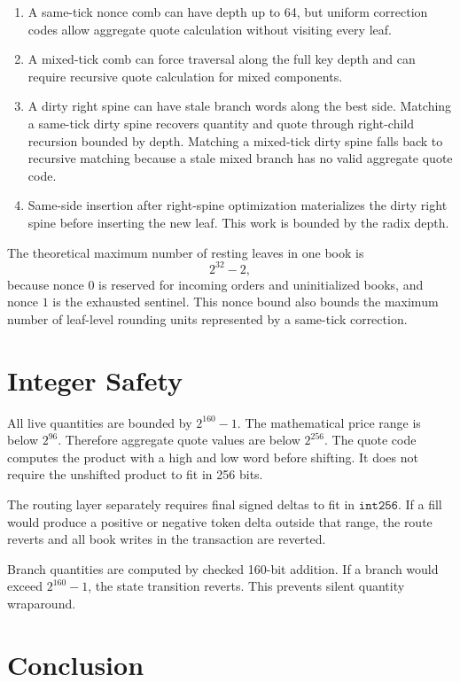 \documentclass[11pt]{article}
\begin{document}
\begin{enumerate}[label=(\roman*)]
  \item A same-tick nonce comb can have depth up to 64, but uniform
  correction codes allow aggregate quote calculation without visiting
  every leaf.
  \item A mixed-tick comb can force traversal along the full key depth
  and can require recursive quote calculation for mixed components.
  \item A dirty right spine can have stale branch words along the best
  side.  Matching a same-tick dirty spine recovers quantity and quote
  through right-child recursion bounded by depth.  Matching a mixed-tick
  dirty spine falls back to recursive matching because a stale mixed
  branch has no valid aggregate quote code.
  \item Same-side insertion after right-spine optimization materializes
  the dirty right spine before inserting the new leaf.  This work is
  bounded by the radix depth.
\end{enumerate}

The theoretical maximum number of resting leaves in one book is
\[
  2^{32}-2,
\]
because nonce \(0\) is reserved for incoming orders and uninitialized
books, and nonce \(1\) is the exhausted sentinel.  This nonce bound also
bounds the maximum number of leaf-level rounding units represented by a
same-tick correction.

\section{Integer Safety}

All live quantities are bounded by \(2^{160}-1\).  The mathematical price
range is below \(2^{96}\).  Therefore aggregate quote values are below
\(2^{256}\).  The quote code computes the product with a high and low
word before shifting.  It does not require the unshifted product to fit
in 256 bits.

The routing layer separately requires final signed deltas to fit in
\(\mathtt{int256}\).  If a fill would produce a positive or negative
token delta outside that range, the route reverts and all book writes in
the transaction are reverted.

Branch quantities are computed by checked 160-bit addition.  If a branch
would exceed \(2^{160}-1\), the state transition reverts.  This prevents
silent quantity wraparound.

\section{Conclusion}
\end{document}

